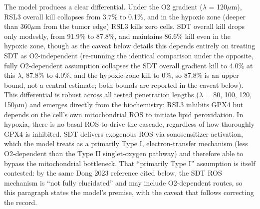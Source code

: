 \documentclass[11pt,twoside,openright]{report}
\begin{document}
The model produces a clear differential. Under the O2 gradient ($\lambda$ = 120$\mu$m), RSL3 overall kill collapses from 3.7\% to 0.1\%, and in the hypoxic zone (deeper than 360$\mu$m from the tumor edge) RSL3 kills zero cells. SDT overall kill drops only modestly, from 91.9\% to 87.8\%, and maintains 86.6\% kill even in the hypoxic zone, though as the caveat below details this depends entirely on treating SDT as O2-independent (re-running the identical comparison under the opposite, fully O2-dependent assumption collapses the SDT overall gradient kill to 4.0\% at this $\lambda$, 87.8\% to 4.0\%, and the hypoxic-zone kill to 0\%, so 87.8\% is an upper bound, not a central estimate; both bounds are reported in the caveat below). This differential is robust across all tested penetration lengths ($\lambda$ = 80, 100, 120, 150$\mu$m) and emerges directly from the biochemistry: RSL3 inhibits GPX4 but depends on the cell's own mitochondrial ROS to initiate lipid peroxidation. In hypoxia, there is no basal ROS to drive the cascade, regardless of how thoroughly GPX4 is inhibited. SDT delivers exogenous ROS via sonosensitizer activation, which the model treats as a primarily Type I, electron-transfer mechanism (less O2-dependent than the Type II singlet-oxygen pathway) and therefore able to bypass the mitochondrial bottleneck. That ``primarily Type I'' assumption is itself contested: by the same Dong 2023 reference cited below, the SDT ROS mechanism is ``not fully elucidated'' and may include O2-dependent routes, so this paragraph states the model's premise, with the caveat that follows correcting the record.
\end{document}
